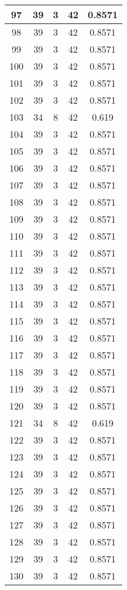\documentclass[letterpaper, 12pt]{article}
\begin{document}
\begin{longtable}{|c|c|c|c|c|}
\hline
97 & 39 & 3 & 42 & 0.8571 \\
\hline
98 & 39 & 3 & 42 & 0.8571 \\
\hline
99 & 39 & 3 & 42 & 0.8571 \\
\hline
100 & 39 & 3 & 42 & 0.8571 \\
\hline
101 & 39 & 3 & 42 & 0.8571 \\
\hline
102 & 39 & 3 & 42 & 0.8571 \\
\hline
103 & 34 & 8 & 42 & 0.619 \\
\hline
104 & 39 & 3 & 42 & 0.8571 \\
\hline
105 & 39 & 3 & 42 & 0.8571 \\
\hline
106 & 39 & 3 & 42 & 0.8571 \\
\hline
107 & 39 & 3 & 42 & 0.8571 \\
\hline
108 & 39 & 3 & 42 & 0.8571 \\
\hline
109 & 39 & 3 & 42 & 0.8571 \\
\hline
110 & 39 & 3 & 42 & 0.8571 \\
\hline
111 & 39 & 3 & 42 & 0.8571 \\
\hline
112 & 39 & 3 & 42 & 0.8571 \\
\hline
113 & 39 & 3 & 42 & 0.8571 \\
\hline
114 & 39 & 3 & 42 & 0.8571 \\
\hline
115 & 39 & 3 & 42 & 0.8571 \\
\hline
116 & 39 & 3 & 42 & 0.8571 \\
\hline
117 & 39 & 3 & 42 & 0.8571 \\
\hline
118 & 39 & 3 & 42 & 0.8571 \\
\hline
119 & 39 & 3 & 42 & 0.8571 \\
\hline
120 & 39 & 3 & 42 & 0.8571 \\
\hline
121 & 34 & 8 & 42 & 0.619 \\
\hline
122 & 39 & 3 & 42 & 0.8571 \\
\hline
123 & 39 & 3 & 42 & 0.8571 \\
\hline
124 & 39 & 3 & 42 & 0.8571 \\
\hline
125 & 39 & 3 & 42 & 0.8571 \\
\hline
126 & 39 & 3 & 42 & 0.8571 \\
\hline
127 & 39 & 3 & 42 & 0.8571 \\
\hline
128 & 39 & 3 & 42 & 0.8571 \\
\hline
129 & 39 & 3 & 42 & 0.8571 \\
\hline
130 & 39 & 3 & 42 & 0.8571 \\

\end{longtable}
\end{document}
